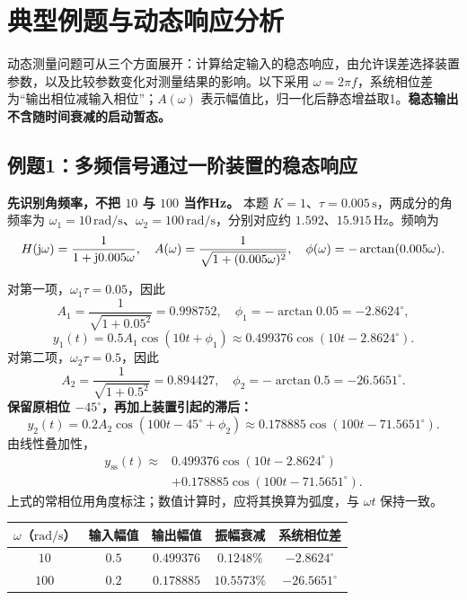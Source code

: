 \clearpage
\section{典型例题与动态响应分析}
\label{sec:ch3-worked-examples}

\noindent 动态测量问题可从三个方面展开：计算给定输入的稳态响应，由允许误差选择装置参数，以及比较参数变化对测量结果的影响。以下采用 $\omega=2\pi f$，系统相位差为“输出相位减输入相位”；$A(\omega)$ 表示幅值比，归一化后静态增益取1。\textbf{稳态输出不含随时间衰减的启动暂态。}

\subsection{例题1：多频信号通过一阶装置的稳态响应}


\sol
\textbf{先识别角频率，不把 $10$ 与 $100$ 当作Hz。}
本题 $K=1$、$\tau=0.005\,\mathrm{s}$，两成分的角频率为
$\omega_1=10\,\mathrm{rad/s}$、$\omega_2=100\,\mathrm{rad/s}$，分别对应约 $1.592$、$15.915\,\mathrm{Hz}$。频响为
\[
H(\mathrm{j}\omega)=\frac{1}{1+\mathrm{j}0.005\omega},\quad
A(\omega)=\frac{1}{\sqrt{1+(0.005\omega)^2}},\quad
\phi(\omega)=-\arctan(0.005\omega).
\]

对第一项，$\omega_1\tau=0.05$，因此
\[
A_1=\frac{1}{\sqrt{1+0.05^2}}=0.998752,\quad
\phi_1=-\arctan0.05=-2.8624^\circ,
\]
\[
y_1(t)=0.5A_1\cos(10t+\phi_1)
\approx0.499376\cos(10t-2.8624^\circ).
\]
对第二项，$\omega_2\tau=0.5$，因此
\[
A_2=\frac{1}{\sqrt{1+0.5^2}}=0.894427,\quad
\phi_2=-\arctan0.5=-26.5651^\circ.
\]
\textbf{保留原相位 $-45^\circ$，再加上装置引起的滞后：}
\[
y_2(t)=0.2A_2\cos(100t-45^\circ+\phi_2)
\approx0.178885\cos(100t-71.5651^\circ).
\]
由线性叠加性，
\[
\boxed{\begin{aligned}
y_{\mathrm{ss}}(t)\approx{}&0.499376\cos(10t-2.8624^\circ)\\
&+0.178885\cos(100t-71.5651^\circ).
\end{aligned}}
\]
上式的常相位用角度标注；数值计算时，应将其换算为弧度，与 $\omega t$ 保持一致。

\begin{table}[H]
\centering\small
\begin{tabular}{@{}c c c c c@{}}
\toprule
$\omega$（$\mathrm{rad/s}$） & 输入幅值 & 输出幅值 & 振幅衰减 & 系统相位差 \\
\midrule
$10$ & $0.5$ & $0.499376$ & $0.1248\%$ & $-2.8624^\circ$ \\
$100$ & $0.2$ & $0.178885$ & $10.5573\%$ & $-26.5651^\circ$ \\
\bottomrule
\end{tabular}
\end{table}

